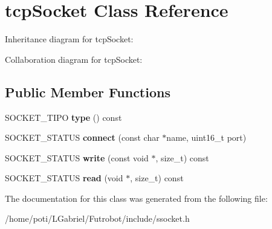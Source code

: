 \hypertarget{classtcpSocket}{}\section{tcp\+Socket Class Reference}
\label{classtcpSocket}


Inheritance diagram for tcp\+Socket\+:


Collaboration diagram for tcp\+Socket\+:
\subsection*{Public Member Functions}
\begin{DoxyCompactItemize}
\item 
S\+O\+C\+K\+E\+T\+\_\+\+T\+I\+PO {\bfseries type} () const \hypertarget{classtcpSocket_ac674b9a5d6ec83f37f4a0462f902da68}{}\label{classtcpSocket_ac674b9a5d6ec83f37f4a0462f902da68}

\item 
S\+O\+C\+K\+E\+T\+\_\+\+S\+T\+A\+T\+US {\bfseries connect} (const char $\ast$name, uint16\+\_\+t port)\hypertarget{classtcpSocket_a07c6872e2bc963c79272b90ecf2ebe1d}{}\label{classtcpSocket_a07c6872e2bc963c79272b90ecf2ebe1d}

\item 
S\+O\+C\+K\+E\+T\+\_\+\+S\+T\+A\+T\+US {\bfseries write} (const void $\ast$, size\+\_\+t) const \hypertarget{classtcpSocket_a0c1be3c2ca9cf7d02753716fbd5312e5}{}\label{classtcpSocket_a0c1be3c2ca9cf7d02753716fbd5312e5}

\item 
S\+O\+C\+K\+E\+T\+\_\+\+S\+T\+A\+T\+US {\bfseries read} (void $\ast$, size\+\_\+t) const \hypertarget{classtcpSocket_a59d5397d708d7cd7307c965828fcc556}{}\label{classtcpSocket_a59d5397d708d7cd7307c965828fcc556}

\end{DoxyCompactItemize}


The documentation for this class was generated from the following file\+:\begin{DoxyCompactItemize}
\item 
/home/poti/\+L\+Gabriel/\+Futrobot/include/ssocket.\+h\end{DoxyCompactItemize}
